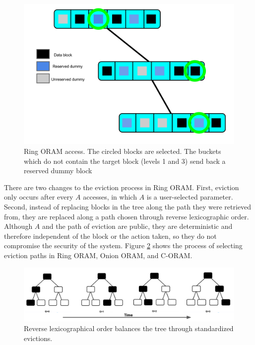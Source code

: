 \documentclass[12pt, oneside]{article}   	%
\begin{document}
\begin{figure}[h!]
  \includegraphics[width=\linewidth]{ringaccess1.png}
  \caption{Ring ORAM access. The circled blocks are selected. The buckets which do not contain the target block (levels 1 and 3) send back a reserved dummy block}
  \label{fig:ringaccess}
\end{figure}


There are two changes to the eviction process in Ring ORAM.  First, eviction only occurs after every $A$ accesses, in which $A$ is a user-selected parameter. Second, instead of replacing blocks in the tree along the path they were retrieved from, they are replaced along a path chosen through reverse lexicographic order. Although $A$ and the path of eviction are public, they are deterministic and therefore independent of the block or the action taken, so they do not compromise the security of the system. Figure \ref{fig:rlo} shows the process of selecting eviction paths in Ring ORAM, Onion ORAM, and C-ORAM.


\begin{figure}[h!]
  \includegraphics[width=\linewidth]{rlo.png}
  \caption{Reverse lexicographical order balances the tree through standardized evictions.}
  \label{fig:rlo}
\end{figure}
\end{document}
